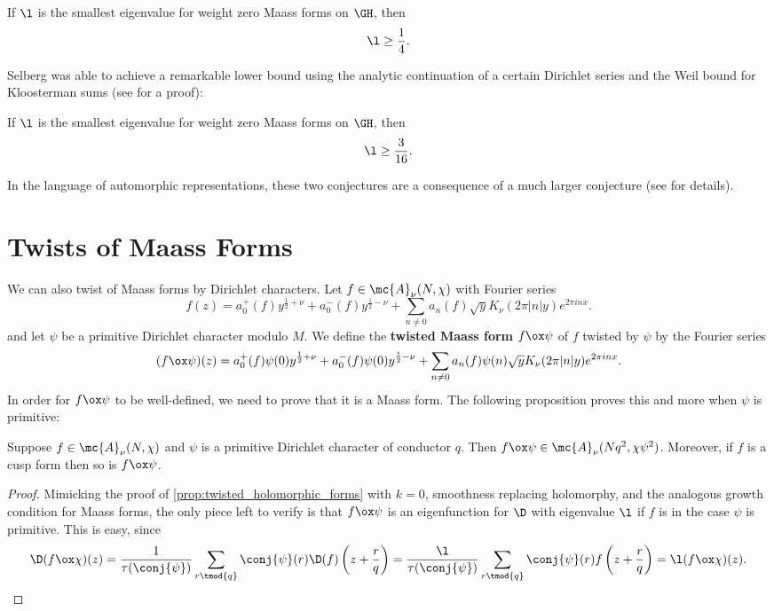     \begin{conjecture}
      If $\l$ is the smallest eigenvalue for weight zero Maass forms on $\GH$, then
      \[
        \l \ge \frac{1}{4}.
      \]
    \end{conjecture}

    Selberg was able to achieve a remarkable lower bound using the analytic continuation of a certain Dirichlet series and the Weil bound for Kloosterman sums (see \cite{iwaniec2002spectral} for a proof):

    \begin{theorem}
      If $\l$ is the smallest eigenvalue for weight zero Maass forms on $\GH$, then
      \[
        \l \ge \frac{3}{16}.
      \]
    \end{theorem}

    In the language of automorphic representations, these two conjectures are a consequence of a much larger conjecture (see \cite{blomer2013role} for details).
  \section{Twists of Maass Forms}
    We can also twist of Maass forms by Dirichlet characters. Let $f \in \mc{A}_{\nu}(N,\chi)$ with Fourier series
    \[
      f(z) = a_{0}^{+}(f)y^{\frac{1}{2}+\nu}+a_{0}^{-}(f)y^{\frac{1}{2}-\nu}+\sum_{n \neq 0}a_{n}(f)\sqrt{y}K_{\nu}(2\pi|n|y)e^{2\pi inx}.
    \]
    and let $\psi$ be a primitive Dirichlet character modulo $M$. We define the \textbf{twisted Maass form} $f \ox \psi$ of $f$ twisted by $\psi$ by the Fourier series
    \[
      (f \ox \psi)(z) = a_{0}^{+}(f)\psi(0)y^{\frac{1}{2}+\nu}+a_{0}^{-}(f)\psi(0)y^{\frac{1}{2}-\nu}+\sum_{n \neq 0}a_{n}(f)\psi(n)\sqrt{y}K_{\nu}(2\pi|n|y)e^{2\pi inx}.
    \]
    In order for $f \ox \psi$ to be well-defined, we need to prove that it is a Maass form. The following proposition proves this and more when $\psi$ is primitive:

    \begin{proposition}\label{prop:twisted_Maass_forms_primitive}
      Suppose $f \in \mc{A}_{\nu}(N,\chi)$ and $\psi$ is a primitive Dirichlet character of conductor $q$. Then $f \ox \psi \in \mc{A}_{\nu}(Nq^{2},\chi\psi^{2})$. Moreover, if $f$ is a cusp form then so is $f \ox \psi$.
    \end{proposition}
    \begin{proof}
      Mimicking the proof of \cref{prop:twisted_holomorphic_forms} with $k = 0$, smoothness replacing holomorphy, and the analogous growth condition for Maass forms, the only piece left to verify is that $f \ox \psi$ is an eigenfunction for $\D$ with eigenvalue $\l$ if $f$ is in the case $\psi$ is primitive. This is easy, since
      \[
        \D(f \ox \chi)(z) = \frac{1}{\tau(\conj{\psi})}\sum_{r \tmod{q}}\conj{\psi}(r)\D(f)\left(z+\frac{r}{q}\right) =  \frac{\l}{\tau(\conj{\psi})}\sum_{r \tmod{q}}\conj{\psi}(r)f\left(z+\frac{r}{q}\right) = \l(f \ox \chi)(z).
      \]
    \end{proof}

